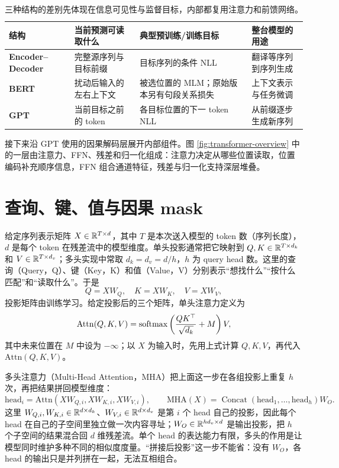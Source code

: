 \begin{table}[ht]
\centering\small
\begin{tabularx}{\textwidth}{>{\bfseries}p{25mm} X X X}
\toprule
结构 & 当前预测可读取什么 & 典型预训练/训练目标 & 整台模型的用途\\
\midrule
Encoder--Decoder & 完整源序列与目标前缀 & 目标序列的条件 NLL & 翻译等序列到序列生成\\
BERT & 扰动后输入的左右上下文 & 被选位置的 MLM；原始版本另有句段关系损失 & 上下文表示与任务微调\\
GPT & 当前目标之前的 token & 各目标位置的下一 token NLL & 从前缀逐步生成新序列\\
\bottomrule
\end{tabularx}
\caption{三种结构的差别先体现在信息可见性与监督目标，内部都复用注意力和前馈网络。}
\label{tab:transformer-objectives}
\end{table}

接下来沿 GPT 使用的因果解码层展开内部组件。图 \ref{fig:transformer-overview} 中的一层由注意力、FFN、残差和归一化组成：注意力决定从哪些位置读取，位置编码补充顺序信息，FFN 组合通道特征，残差与归一化支持深层堆叠。

\section{查询、键、值与因果 mask}

给定序列表示矩阵 \(X\in\mathbb{R}^{T\times d}\)，其中 \(T\) 是本次送入模型的 token 数（序列长度），\(d\) 是每个 token 在残差流中的模型维度。单头投影通常把它映射到 \(Q,K\in\mathbb{R}^{T\times d_k}\) 和 \(V\in\mathbb{R}^{T\times d_v}\)；多头实现中常取 \(d_k=d_v=d/h\)，\(h\) 为 query head 数。这里的查询（Query，Q）、键（Key，K）和值（Value，V）分别表示“想找什么”“按什么匹配”和“读取什么”。于是
\begin{equation}
 Q=XW_Q,\quad K=XW_K,\quad V=XW_V,
\end{equation}
投影矩阵由训练学习。给定投影后的三个矩阵，单头注意力定义为
\begin{equation}
 \mathrm{Attn}(Q,K,V)=\operatorname{softmax}\left(\frac{QK^\top}{\sqrt{d_k}}+M\right)V,
\end{equation}
其中未来位置在 \(M\) 中设为 \(-\infty\)；以 \(X\) 为输入时，先用上式计算 \(Q,K,V\)，再代入 \(\mathrm{Attn}(Q,K,V)\)。

多头注意力（Multi-Head Attention，MHA）把上面这一步在各组投影上重复 \(h\) 次，再把结果拼回模型维度：
\begin{equation}
 \mathrm{head}_i=\mathrm{Attn}(XW_{Q,i},XW_{K,i},XW_{V,i}),\qquad
 \mathrm{MHA}(X)=\operatorname{Concat}(\mathrm{head}_1,\ldots,\mathrm{head}_h)W_O.
\end{equation}
这里 \(W_{Q,i},W_{K,i}\in\mathbb{R}^{d\times d_k}\)、\(W_{V,i}\in\mathbb{R}^{d\times d_v}\) 是第 \(i\) 个 head 自己的投影，因此每个 head 在自己的子空间里独立做一次内容寻址；\(W_O\in\mathbb{R}^{hd_v\times d}\) 是输出投影，把 \(h\) 个子空间的结果混合回 \(d\) 维残差流。单个 head 的表达能力有限，多头的作用是让模型同时维护多种不同的相似度度量。“拼接后投影”这一步不能省：没有 \(W_O\)，各 head 的输出只是并列拼在一起，无法互相组合。

